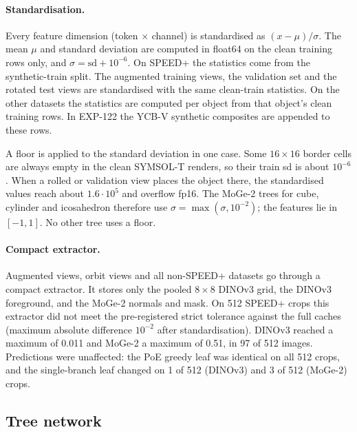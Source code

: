 \paragraph{Standardisation.}
Every feature dimension (token $\times$ channel) is standardised as $(x-\mu)/\sigma$. The mean $\mu$ and standard deviation are computed in float64 on the clean training rows only, and $\sigma=\mathrm{sd}+10^{-6}$. On SPEED+ the statistics come from the synthetic-train split. The augmented training views, the validation set and the rotated test views are standardised with the same clean-train statistics. On the other datasets the statistics are computed per object from that object's clean training rows. In EXP-122 the YCB-V synthetic composites are appended to these rows.

A floor is applied to the standard deviation in one case. Some $16\times16$ border cells are always empty in the clean SYMSOL-T renders, so their train sd is about $10^{-6}$. When a rolled or validation view places the object there, the standardised values reach about $1.6\cdot10^5$ and overflow fp16. The MoGe-2 trees for cube, cylinder and icosahedron therefore use $\sigma=\max(\sigma,10^{-2})$; the features lie in $[-1,1]$. No other tree uses a floor.

\paragraph{Compact extractor.}
Augmented views, orbit views and all non-SPEED+ datasets go through a compact extractor. It stores only the pooled $8\times8$ DINOv3 grid, the DINOv3 foreground, and the MoGe-2 normals and mask. On 512 SPEED+ crops this extractor did not meet the pre-registered strict tolerance against the full caches (maximum absolute difference $10^{-2}$ after standardisation). DINOv3 reached a maximum of 0.011 and MoGe-2 a maximum of 0.51, in 97 of 512 images. Predictions were unaffected: the PoE greedy leaf was identical on all 512 crops, and the single-branch leaf changed on 1 of 512 (DINOv3) and 3 of 512 (MoGe-2) crops.

\subsection{Tree network}\label{app:treenet}

